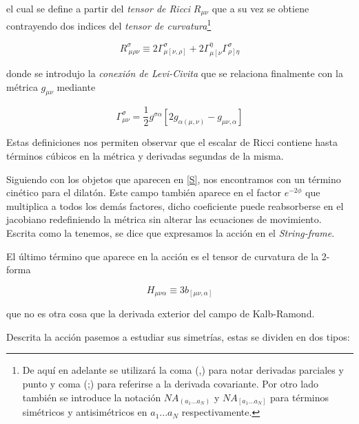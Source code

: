 \documentclass{article}
\numberwithin{equation}{section}
\begin{document}
el cual se define a partir del \textit{tensor de Ricci} $ R_{\mu\nu} $ que a su vez se obtiene contrayendo dos indices del \textit{tensor de curvatura}\footnote{De aquí en adelante se utilizará la coma (,) para notar derivadas parciales y punto y coma (;) para referirse a la derivada covariante. Por otro lado también se introduce la notación $ N A_{\left(a_1... a_N \right)} $ y $ N A_{\left[a_1...a_N \right]} $ para términos simétricos y antisimétricos en $ a_1...a_N $ respectivamente. }

\begin{equation}\label{riccitensor}
 R^{\sigma}_{ \ \mu \rho \nu} \equiv 2\Gamma^{\sigma}_{\mu\left[ \nu \right.,\left. \rho \right]} +   2\Gamma^{\eta}_{\mu\left[ \nu \right.}\Gamma^{\sigma}_{ \left. \rho \right] \eta}
\end{equation} 

donde se introdujo la \textit{conexión de Levi-Civita} que se relaciona finalmente con la métrica $ g_{\mu\nu} $ mediante

\begin{equation*}
\Gamma^{\sigma}_{\mu\nu} = \frac{1}{2}g^{\sigma \alpha}\left[ 2g_{\alpha (\mu,\nu)} - g_{\mu\nu,\alpha}\right]
\end{equation*}

Estas definiciones nos permiten observar que el escalar de Ricci contiene hasta términos cúbicos en la métrica y derivadas segundas de la misma.

Siguiendo con los objetos que aparecen en \ref{S}, nos encontramos con un término cinético para el dilatón. Este campo también aparece en el factor $e^{-2\phi} $ que multiplica a todos los demás factores, dicho coeficiente puede reabsorberse en el jacobiano redefiniendo la métrica sin alterar las ecuaciones de movimiento. Escrita como la tenemos, se dice que expresamos la acción en el \textit{String-frame}.

El último término que aparece en la acción es el tensor de curvatura de la 2-forma

\begin{equation}\label{H}
H_{\mu \nu \alpha} \equiv 3 b_{\left[ \mu \nu , \alpha \right] }
\end{equation}

que no es otra cosa que la derivada exterior del campo de Kalb-Ramond.

\newpage

Descrita la acción pasemos a estudiar sus simetrías, estas se dividen en dos tipos:

\vspace{0.4cm}
\end{document}
